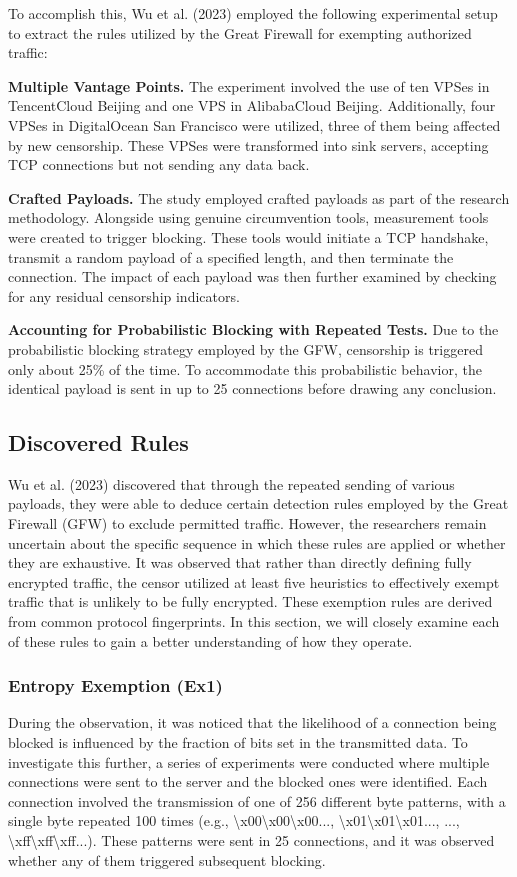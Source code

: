 To accomplish this, Wu et al. (2023) employed the following experimental setup to extract the rules utilized by the Great Firewall for exempting authorized traffic:

\textbf{Multiple Vantage Points.} The experiment involved the use of ten VPSes in TencentCloud Beijing and one VPS in AlibabaCloud Beijing. Additionally, four VPSes in DigitalOcean San Francisco were utilized, three of them being affected by new censorship. These VPSes were transformed into sink servers, accepting TCP connections but not sending any data back.

\textbf{Crafted Payloads.} The study employed crafted payloads as part of the research methodology. Alongside using genuine circumvention tools, measurement tools were created to trigger blocking. These tools would initiate a TCP handshake, transmit a random payload of a specified length, and then terminate the connection. The impact of each payload was then further examined by checking for any residual censorship indicators.

\textbf{Accounting for Probabilistic Blocking with Repeated Tests.} Due to the probabilistic blocking strategy employed by the GFW, censorship is triggered only about 25\% of the time. To accommodate this probabilistic behavior, the identical payload is sent in up to 25 connections before drawing any conclusion.


\subsection{Discovered Rules}
Wu et al. (2023) discovered that through the repeated sending of various payloads, they were able to deduce certain detection rules employed by the Great Firewall (GFW) to exclude permitted traffic. However, the researchers remain uncertain about the specific sequence in which these rules are applied or whether they are exhaustive. It was observed that rather than directly defining fully encrypted traffic, the censor utilized at least five heuristics to effectively exempt traffic that is unlikely to be fully encrypted. These exemption rules are derived from common protocol fingerprints. In this section, we will closely examine each of these rules to gain a better understanding of how they operate.

\subsubsection{\textbf{Entropy Exemption (Ex1)}}
During the observation, it was noticed that the likelihood of a connection being blocked is influenced by the fraction of bits set in the transmitted data. To investigate this further, a series of experiments were conducted where multiple connections were sent to the server and the blocked ones were identified. Each connection involved the transmission of one of 256 different byte patterns, with a single byte repeated 100 times (e.g., \textbackslash x00\textbackslash x00\textbackslash x00..., \textbackslash x01\textbackslash x01\textbackslash x01..., ..., \textbackslash xff\textbackslash xff\textbackslash xff...). These patterns were sent in 25 connections, and it was observed whether any of them triggered subsequent blocking.


